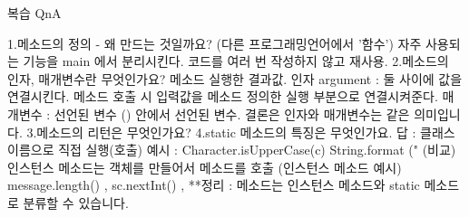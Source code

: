 복습 QnA

1.메소드의 정의 - 왜 만드는 것일까요?       (다른 프로그래밍언어에서 '함수')
                자주 사용되는 기능을 main 에서 분리시킨다.
                코드를 여러 번 작성하지 않고 재사용.
2.메소드의 인자, 매개변수란 무엇인가요?     메소드 실행한 결과값.
            인자 argument : 둘 사이에 값을 연결시킨다.
                        메소드 호출 시 입력값을 메소드 정의한 실행 부분으로 연결시켜준다.
            매개변수 : 선언된 변수 () 안에서 선언된 변수.
        결론은 인자와 매개변수는 같은 의미입니다.
3.메소드의 리턴은 무엇인가요?       
4.static 메소드의 특징은 무엇인가요.
        답 : 클래스 이름으로 직접 실행(호출)
        예시 : Character.isUpperCase(c) String.format ("%
(비교) 인스턴스 메소드는 객체를 만들어서 메소드를 호출
(인스턴스 메소드 예시) message.length() , sc.nextInt() ,
**정리 : 메소드는 인스턴스 메소드와 static 메소드로 분류할 수 있습니다.     